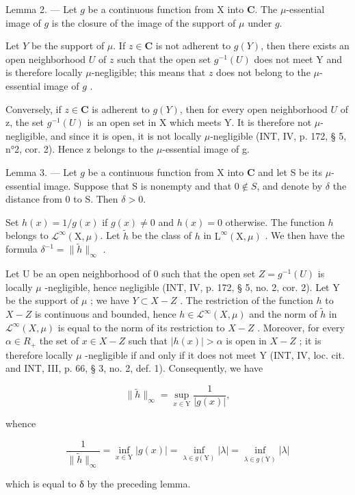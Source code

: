 Lemma 2. --- Let \(g\) be a continuous function from X into \(\mathbf{C}\). The \(\mu\)-essential image of \(g\) is the closure of the image of the support of \(\mu\) under \(g\).

Let \(Y\) be the support of \(\mu\). If \(z \in \mathbf{C}\) is not adherent to \(g(Y)\), then there exists an open neighborhood \(U\) of \(z\) such that the open set \(g^{-1}(U)\) does not meet Y and is therefore locally \(\mu\)-negligible; this means that \(z\) does not belong to the \(\mu\)-essential image of \(g\) .

Conversely, if \(z \in \mathbf{C}\) is adherent to \(g(Y)\), then for every open neighborhood \(U\) of z, the set \(g^{-1}(U)\) is an open set in X which meets Y. It is therefore not \(\mu\)-negligible, and since it is open, it is not locally \(\mu\)-negligible (INT, IV, p. 172, § 5, n°2, cor. 2). Hence z belongs to the \(\mu\)-essential image of g.

Lemma 3. --- Let \(g\) be a continuous function from X into \(\mathbf{C}\) and let S be its \(\mu\)-essential image. Suppose that S is nonempty and that \(0 \notin S\), and denote by \(\delta\) the distance from 0 to S. Then \(\delta > 0\).

Set \(h(x) = 1 / g(x)\) if \(g(x) \neq 0\) and \(h(x) = 0\) otherwise. The function \(h\) belongs to \(\mathcal{L}^{\infty}(\mathrm{X},\mu)\). Let \(\widetilde{h}\) be the class of \(h\) in \(\mathrm{L}^{\infty}(\mathrm{X},\mu)\) . We then have the formula \(\delta^{-1} = \| \widetilde{h}\|_{\infty}\) .

Let U be an open neighborhood of 0 such that the open set \(Z = g^{-1}(U)\) is locally \(\mu\) -negligible, hence negligible (INT, IV, p. 172, § 5, no. 2, cor. 2). Let Y be the support of \(\mu\) ; we have \(Y \subset X - Z\) . The restriction of the function \(h\) to \(X - Z\) is continuous and bounded, hence \(h \in \mathcal{L}^{\infty}(X, \mu)\) and the norm of \(\widetilde{h}\) in \(\mathcal{L}^{\infty}(X, \mu)\) is equal to the norm of its restriction to \(X - Z\) . Moreover, for every \(\alpha \in R_{+}\) the set of \(x \in X - Z\) such that \(|h(x)| > \alpha\) is open in \(X - Z\) ; it is therefore locally \(\mu\) -negligible if and only if it does not meet Y (INT, IV, loc. cit. and INT, III, p. 66, § 3, no. 2, def. 1). Consequently, we have

\[
\| \widetilde {h} \| _ {\infty} = \sup _ {x \in \mathrm{Y}} \frac {1}{| g (x) |},
\]

whence

\[
\frac {1}{\| \widetilde {h} \| _ {\infty}} = \inf _ {x \in \mathrm{Y}} | g (x) | = \inf _ {\lambda \in g (\mathrm{Y})} | \lambda | = \inf _ {\lambda \in \overline {{g (\mathrm{Y})}}} | \lambda |
\]

which is equal to δ by the preceding lemma.

